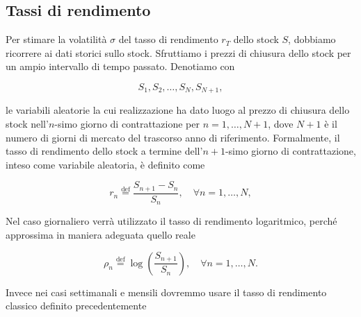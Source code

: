 \documentclass[compress]{beamer}
\begin{document}
\subsection{Tassi di rendimento}
\begin{frame}{\subsecname}
	Per stimare la volatilità $\sigma$ del tasso di rendimento $r_T$ dello stock $S$, dobbiamo ricorrere ai dati storici sullo stock. Sfruttiamo i prezzi di chiusura dello stock per un ampio intervallo di tempo passato. Denotiamo con

	\[
		S_1, S_2, \dots, S_N, S_{N+1},
	\]

	le variabili aleatorie la cui realizzazione ha dato luogo al prezzo di chiusura dello stock nell'$n$-simo giorno di contrattazione per $n = 1, \dots, N+1$, dove $N+1$ è il numero di giorni di mercato del trascorso anno di riferimento. Formalmente, il tasso di rendimento dello stock a termine dell’$n+1$-simo giorno di contrattazione, inteso come variabile aleatoria, è definito come

	\[
		r_n \overset{\text{def}}{=} \frac{S_{n+1} - S_n}{S_n}, \quad \forall n = 1, \dots, N,
	\]
\end{frame}
\begin{frame}{\subsecname}
	Nel caso giornaliero verrà utilizzato il tasso di rendimento logaritmico, perché approssima in maniera adeguata quello reale

	\[
		\rho_n \overset{\text{def}}{=} \log \left( \frac{S_{n+1}}{S_n} \right), \quad \forall n = 1, \dots, N.
	\]

    Invece nei casi settimanali e mensili dovremmo usare il tasso di rendimento classico definito precedentemente
\end{frame}
\end{document}
